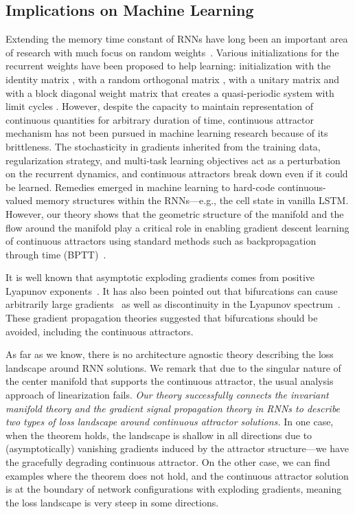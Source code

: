 \documentclass{article}
\newcounter{ct}
\theoremstyle{definition}
\theoremstyle{remark}
\begin{document}
\subsection{Implications on Machine Learning}\label{sec:imp:ML}
Extending the memory time constant of RNNs have long been an important area of research with much focus on random weights~\cite{Legenstein2007,Goldman2009,Toyoizumi2011,Kerg2019,Chen2018,Henaff2016,Rusch2021,arjovsky2016}.
Various initializations for the recurrent weights have been proposed to help learning: initialization with the identity matrix \citep{le2015}, with a random orthogonal matrix \citep{saxe2014,Henaff2016}, with a unitary matrix \citep{arjovsky2016} and with a block diagonal weight matrix that creates a quasi-periodic system with limit cycles \citep{Sokol2019a}.
However, despite the capacity to maintain representation of continuous quantities for arbitrary duration of time, continuous attractor mechanism has not been pursued in machine learning research because of its brittleness.
The stochasticity in gradients inherited from the training data, regularization strategy, and multi-task learning objectives act as a perturbation on the recurrent dynamics, and continuous attractors break down even if it could be learned.
Remedies emerged in machine learning to hard-code continuous-valued memory structures within the RNNs---e.g., the cell state in vanilla LSTM.
However, our theory shows that the geometric structure of the manifold and the flow around the manifold play a critical role in enabling gradient descent learning of continuous attractors using standard methods such as backpropagation through time (BPTT)~\cite{Toomarian1991}.

It is well known that asymptotic exploding gradients comes from positive Lyapunov exponents~\cite{Mikhaeil2022,Vogt2022,Engelken2023}.
It has also been pointed out that bifurcations can cause arbitrarily large gradients~\cite{doya1993} as well as discontinuity in the Lyapunov spectrum~\cite{Park2023a}.
These gradient propagation theories suggested that bifurcations should be avoided, including the continuous attractors.

As far as we know, there is no architecture agnostic theory describing the loss landscape around RNN solutions.
We remark that due to the singular nature of the center manifold that supports the continuous attractor, the usual analysis approach of linearization fails.
\emph{Our theory successfully connects the invariant manifold theory and the gradient signal propagation theory in RNNs to describe two types of loss landscape around continuous attractor solutions.}
In one case, when the theorem holds, the landscape is shallow in all directions due to (asymptotically) vanishing gradients induced by the attractor structure---we have the gracefully degrading continuous attractor.
On the other case, we can find examples where the theorem does not hold, and the continuous attractor solution is at the boundary of network configurations with exploding gradients, meaning the loss landscape is very steep in some directions.
\end{document}
